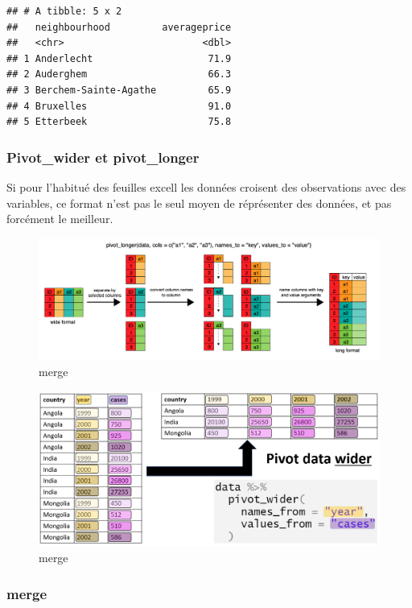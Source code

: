 \documentclass[
]{book}
\begin{document}
\begin{verbatim}
## # A tibble: 5 x 2
##   neighbourhood         averageprice
##   <chr>                        <dbl>
## 1 Anderlecht                    71.9
## 2 Auderghem                     66.3
## 3 Berchem-Sainte-Agathe         65.9
## 4 Bruxelles                     91.0
## 5 Etterbeek                     75.8
\end{verbatim}

\hypertarget{pivot_wider-et-pivot_longer}{%
\subsubsection{Pivot\_wider et pivot\_longer}\label{pivot_wider-et-pivot_longer}}

Si pour l'habitué des feuilles excell les données croisent des observations avec des variables, ce format n'est pas le seul moyen de réprésenter des données, et pas forcément le meilleur.

\begin{figure}
\centering
\includegraphics{./Images/pivot_longer.png}
\caption{merge}
\end{figure}

\begin{figure}
\centering
\includegraphics{./Images/pivot_wider.png}
\caption{merge}
\end{figure}

\hypertarget{merge}{%
\subsubsection{merge}\label{merge}}
\end{document}
